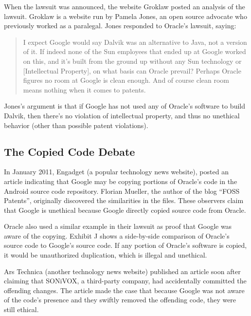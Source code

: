\documentclass[11pt]{article}
\begin{document}
\begin{multicols}{2}
When the lawsuit was announced, the website Groklaw posted an analysis of the
lawsuit.  Groklaw is a website run by Pamela Jones, an open source advocate who
previously worked as a paralegal. \cite{groklaw-pj} Jones responded to Oracle's
lawsuit, saying: \cite{groklaw}

\begin{quotation}
I expect Google would say Dalvik was an alternative to Java, not a version of
it. If indeed none of the Sun employees that ended up at Google worked on this,
and it's built from the ground up without any Sun technology or [Intellectual
Property], on what basis can Oracle prevail? Perhaps Oracle figures no room at
Google is clean enough. And of course clean room means nothing when it comes to
patents.
\end{quotation}

Jones's argument is that if Google has not used any of Oracle's software to
build Dalvik, then there's no violation of intellectual property, and thus no
unethical behavior (other than possible patent violations).


\subsection{The Copied Code Debate} %
\label{sub:fosspatents}

In January 2011, Engadget (a popular technology news website), posted an article
indicating that Google may be copying portions of Oracle's code in the Android
source code repository.  \cite{android-copies-java-code}  Florian Mueller, the
author of the blog ``FOSS Patents'', originally discovered the similarities in
the files.  \cite{fosspatents} These observers claim that Google is unethical
because Google directly copied source code from Oracle.


Oracle also used a similar example in their lawsuit as proof that Google was
aware of the copying.  Exhibit J shows a side-by-side comparison of Oracle's
source code to Google's source code.  If any portion of Oracle's software is
copied, it would be unauthorized duplication, which is illegal and unethical.

Ars Technica (another technology news website) published an article soon after
claiming that SONiVOX, a third-party company, had accidentally committed the
offending changes.  \cite{ars-tech-copying}  The article made the case that
because Google was not aware of the code's presence and they swiftly removed the
offending code, they were still ethical.


\end{multicols}
\end{document}
